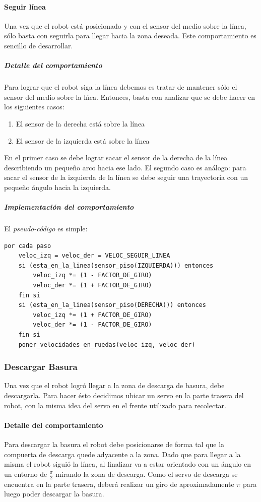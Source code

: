\paragraph{Seguir l\'inea}
\label{follow_line}
Una vez que el robot est\'a posicionado y con el sensor del medio sobre la
l\'inea, s\'olo basta con seguirla para llegar hacia la zona deseada. Este
comportamiento es sencillo de desarrollar.

\subparagraph{Detalle del comportamiento}
Para lograr que el robot siga la l\'inea debemos es tratar de mantener
s\'olo el sensor del medio sobre la l\'nea. Entonces, basta con analizar que se
debe hacer en los siguientes casos:
\begin{enumerate}
	\item El sensor de la derecha est\'a sobre la l\'inea
	\item El sensor de la izquierda est\'a sobre la l\'inea
\end{enumerate}
En el primer caso se debe lograr sacar el sensor de la derecha de la l\'inea
describiendo un peque\~no arco hacia ese lado. El segundo caso es an\'alogo:
para sacar el sensor de la izquierda de la l\'inea se debe seguir una
trayectoria con un peque\~no \'angulo hacia la izquierda. 

\subparagraph{Implementaci\'on del comportamiento}
El \emph{pseudo-c\'odigo} es simple:
\begin{verbatim}
por cada paso
    veloc_izq = veloc_der = VELOC_SEGUIR_LINEA
    si (esta_en_la_linea(sensor_piso(IZQUIERDA))) entonces
        veloc_izq *= (1 - FACTOR_DE_GIRO)
        veloc_der *= (1 + FACTOR_DE_GIRO)
    fin si
    si (esta_en_la_linea(sensor_piso(DERECHA))) entonces
        veloc_izq *= (1 + FACTOR_DE_GIRO)
        veloc_der *= (1 - FACTOR_DE_GIRO)
    fin si
    poner_velocidades_en_ruedas(veloc_izq, veloc_der)
\end{verbatim}

\subsubsection{Descargar Basura}
\label{unload_garbage}
Una vez que el robot logr\'o llegar a la zona de descarga de basura, debe
descargarla. Para hacer \'esto decidimos ubicar un servo en la parte trasera
del robot, con la misma idea del servo en el frente utilizado para
recolectar.

\paragraph{Detalle del comportamiento}
Para descargar la basura el robot debe posicionarse de forma tal que la
compuerta de descarga quede adyacente a la zona. Dado que para llegar a la
misma el robot sigui\'o la l\'inea, al finalizar va a estar orientado con un
\'angulo en un entorno de $\frac{\pi}{2}$ mirando la zona de descarga. Como el
servo de descarga se encuentra en la parte trasera, deber\'a realizar un giro
de aproximadamente $\pi$ para luego poder descargar la basura.
